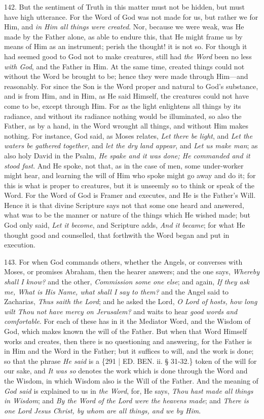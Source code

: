 142. But the sentiment of
Truth in this matter must not be hidden, but must have high utterance.
For the Word of God was not made for us, but rather we for Him, and \emph{in
Him all things were created}. Nor, because we were weak, was He
made by the Father alone, as able to endure this, that He might frame
us by means of Him as an instrument; perish the thought! it is not so.
For though it had seemed good to God not to make creatures, still had \emph{the
Word} been no less \emph{with God}, and the Father in Him. At the
same time, created things could not without the Word be brought to be;
hence they were made through Him—and reasonably. For since the Son
is the Word proper and natural to God's substance, and is from Him,
and in Him, as He said Himself, the creatures could not have
come to be, except through Him. For as the light enlightens all things
by its radiance, and without its radiance nothing would be
illuminated, so also the Father, as by a hand, in the Word wrought all
things, and without Him makes nothing. For instance, God said, as
Moses relates, \emph{Let there be light}, and \emph{Let the waters be
gathered together}, and \emph{let the dry land appear}, and \emph{Let
us make man}; as also holy David in the Psalm, \emph{He spake and it
was done; He commanded and it stood fast}. And He spoke, not that,
as in the case of men, some under-worker might hear, and learning the
will of Him who spoke might go away and do it; for this is what is
proper to creatures, but it is unseemly so to think or speak of the
Word. For the Word of God is Framer and executes, and He is the Father's
Will. Hence it is that divine Scripture says not that some one heard
and answered, what was to be the manner or nature of the things which
He wished made; but God only said, \emph{Let it become}, and Scripture
adds, \emph{And it became}; for what He thought good and counselled,
that forthwith the Word began and put in execution.

143. For when God commands
others, whether the Angels, or converses with Moses, or promises
Abraham, then the hearer answers; and the one says, \emph{Whereby shall I
know?} and the other, \emph{Commission some one else}; and again, \emph{If
they ask me, What is His Name, what shall I say to them?} and the
Angel said to Zacharias, \emph{Thus saith the Lord}; and he asked the
Lord, \emph{O Lord of hosts, how long wilt Thou not have mercy on
Jerusalem?} and waits to hear \emph{good words and comfortable}.
For each of these has in it the Mediator Word, and the Wisdom of God,
which makes known the will of the Father. But when that Word Himself
works and creates, then there is no questioning and answering, for the
Father is in Him and the Word in the Father; but it suffices to will,
and the work is done; so that the phrase \emph{He said} is a \{291 | ED. BEN.
ii. § 31-32.\} token of the will for our sake, and \emph{It was so}
denotes the work which is done through the Word and the Wisdom, in
which Wisdom also is the Will of the Father. And the meaning of \emph{God
said} is explained to us in \emph{the Word}, for, He says, \emph{Thou
hast made all things in Wisdom}; and \emph{By the Word of the Lord
were the heavens made}; and \emph{There is one Lord Jesus Christ, by
whom are all things, and we by Him}.

